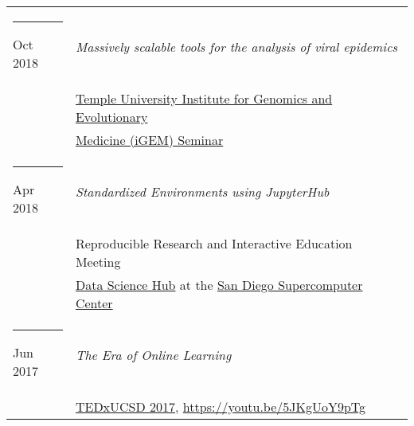 \documentclass[margin,line]{res}
\begin{document}
\begin{resume}
\begin{longtable}{@{}p{0.7in}p{4in}}
\hspace*{-4mm} \rule{-1mm}{5mm} Oct 2018 & \textit{Massively scalable tools for the analysis of viral epidemics}\\*
\hspace*{-4mm} & \hspace{4mm} \href{http://igem.temple.edu/home}{Temple University Institute for Genomics and Evolutionary}\\*
\hspace*{-4mm} & \hspace{4mm} \href{http://igem.temple.edu/home}{Medicine (iGEM) Seminar}\\
\hspace*{-4mm} \rule{-1mm}{5mm} Apr 2018 & \textit{Standardized Environments using JupyterHub}\\*
\hspace*{-4mm} & \hspace{4mm} Reproducible Research and Interactive Education Meeting\\*
\hspace*{-4mm} & \hspace{4mm} \href{https://datascience.sdsc.edu/}{Data Science Hub} at the \href{https://www.sdsc.edu/}{San Diego Supercomputer Center}\\
\hspace*{-4mm} \rule{-1mm}{5mm} Jun 2017 & \textit{The Era of Online Learning}\\*
\hspace*{-4mm} & \hspace{4mm} \href{https://www.ted.com/tedx/events/22004}{TEDxUCSD 2017}, \href{https://youtu.be/5JKgUoY9pTg}{https://youtu.be/5JKgUoY9pTg}\\
\end{longtable}


\end{resume}
\end{document}
